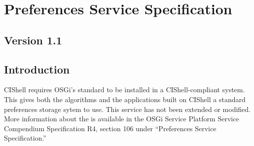 \chapter{Preferences Service Specification}
\label{preferencesService}
\section*{Version 1.1}
\section{Introduction}

CIShell requires OSGi's standard  to be installed in a
CIShell-compliant system. This gives both the algorithms and the applications
built on CIShell a standard preferences storage sytem to use. This service has
not been extended or modified. More information about the
 is available in the OSGi Service Platform Service
Compendium Specification R4, section 106 under ``Preferences Service
Specification.''

